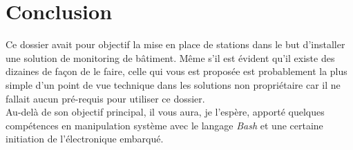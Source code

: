 \chapter*{Conclusion}


Ce dossier avait pour objectif la mise en place de stations dans le but d'installer une solution de monitoring de bâtiment. Même s'il est évident qu'il existe des dizaines de façon de le faire, celle qui vous est proposée est probablement la plus simple d'un point de vue technique dans les solutions non propriétaire car il ne fallait aucun pré-requis pour utiliser ce dossier.\\

Au-delà de son objectif principal, il vous aura, je l'espère, apporté quelques compétences en manipulation système avec le langage \textit{Bash} et une certaine initiation de l'électronique embarqué.